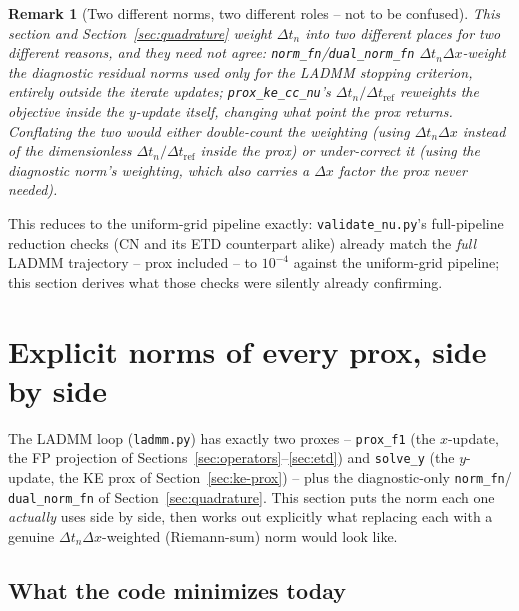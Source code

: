 \documentclass[11pt]{article}
\newtheorem{remark}{Remark}
\newcommand{\dt}{\Delta t}
\newcommand{\dx}{\Delta x}
\newcommand{\code}[1]{\texttt{#1}}
\begin{document}
\begin{remark}[Two different norms, two different roles -- not to be confused]
This section and Section~\ref{sec:quadrature} weight $\dt_n$ into two \emph{different} places
for two \emph{different} reasons, and they need not agree: \code{norm\_fn}/\code{dual\_norm\_fn}
$\dt_n\dx$-weight the \emph{diagnostic} residual norms used only for the LADMM stopping
criterion, entirely outside the iterate updates; \code{prox\_ke\_cc\_nu}'s
$\dt_n/\dt_\mathrm{ref}$ reweights the \emph{objective} inside the $y$-update itself, changing
what point the prox returns. Conflating the two would either double-count the weighting (using
$\dt_n\dx$ instead of the dimensionless $\dt_n/\dt_\mathrm{ref}$ inside the prox) or under-correct
it (using the diagnostic norm's weighting, which also carries a $\dx$ factor the prox never
needed).
\end{remark}

This reduces to the uniform-grid pipeline exactly: \code{validate\_nu.py}'s full-pipeline
reduction checks (CN and its ETD counterpart alike) already match the \emph{full} LADMM
trajectory -- prox included -- to $10^{-4}$ against the uniform-grid pipeline; this section
derives what those checks were silently already confirming.

\section{Explicit norms of every prox, side by side}
\label{sec:norms-all}

The LADMM loop (\code{ladmm.py}) has exactly two proxes -- \code{prox\_f1} (the $x$-update, the
FP projection of Sections~\ref{sec:operators}--\ref{sec:etd}) and \code{solve\_y} (the $y$-update,
the KE prox of Section~\ref{sec:ke-prox}) -- plus the diagnostic-only \code{norm\_fn}/
\code{dual\_norm\_fn} of Section~\ref{sec:quadrature}. This section puts the norm each one
\emph{actually} uses side by side, then works out explicitly what replacing each with a genuine
$\dt_n\dx$-weighted (Riemann-sum) norm would look like.

\subsection*{What the code minimizes today}
\end{document}
